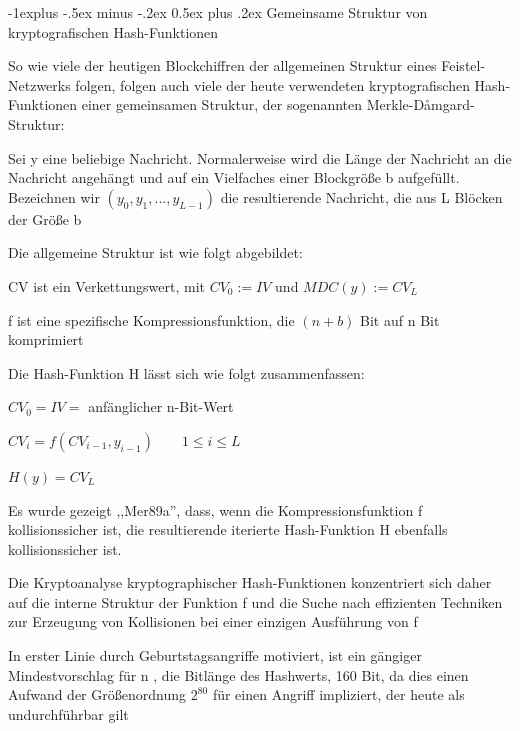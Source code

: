 \documentclass[a4paper]{article}
\makeatletter
\renewcommand{\subsection}{\@startsection{subsection}{2}{0mm}%
 {-1explus -.5ex minus -.2ex}%
 {0.5ex plus .2ex}%
 {\normalfont\normalsize\bfseries}}
\makeatother
\begin{document}
\begin{multicols}{3}
      \subsection{Gemeinsame Struktur von kryptografischen Hash-Funktionen}
      \begin{itemize*}
            \item So wie viele der heutigen Blockchiffren der allgemeinen Struktur eines
            Feistel-Netzwerks folgen, folgen auch viele der heute verwendeten
            kryptografischen Hash-Funktionen einer gemeinsamen Struktur, der
            sogenannten Merkle-Dåmgard-Struktur:
            \begin{itemize*}
                  \item Sei y eine beliebige Nachricht. Normalerweise wird die Länge der Nachricht an die Nachricht angehängt und auf ein Vielfaches einer Blockgröße b aufgefüllt. Bezeichnen wir $(y_0,y_1,...,y_{L-1})$ die resultierende Nachricht, die aus L Blöcken der Größe b
                  \item Die allgemeine Struktur ist wie folgt abgebildet: %
                  \item CV ist ein Verkettungswert, mit $CV_0:= IV$ und $MDC(y) := CV_L$
                  \item f ist eine spezifische Kompressionsfunktion, die $(n+b)$ Bit auf n Bit komprimiert
            \end{itemize*}
            \item Die Hash-Funktion H lässt sich wie folgt zusammenfassen:
            \begin{itemize*}
                  \item $CV_0 = IV =$ anfänglicher n-Bit-Wert
                  \item $CV_i = f(CV_{i -1}, y_{i-1}) \quad\quad 1\leq i \leq L$
                  \item $H(y) = CV_L$
            \end{itemize*}
            \item Es wurde gezeigt ,,Mer89a'', dass, wenn die Kompressionsfunktion f
            kollisionssicher ist, die resultierende iterierte Hash-Funktion H
            ebenfalls kollisionssicher ist.
            \item Die Kryptoanalyse kryptographischer Hash-Funktionen konzentriert sich
            daher auf die interne Struktur der Funktion f und die Suche nach
            effizienten Techniken zur Erzeugung von Kollisionen bei einer einzigen
            Ausführung von f
            \item In erster Linie durch Geburtstagsangriffe motiviert, ist ein gängiger
            Mindestvorschlag für n , die Bitlänge des Hashwerts, 160 Bit, da dies
            einen Aufwand der Größenordnung $2^{80}$ für einen Angriff
            impliziert, der heute als undurchführbar gilt
      \end{itemize*}



\end{multicols}
\end{document}
